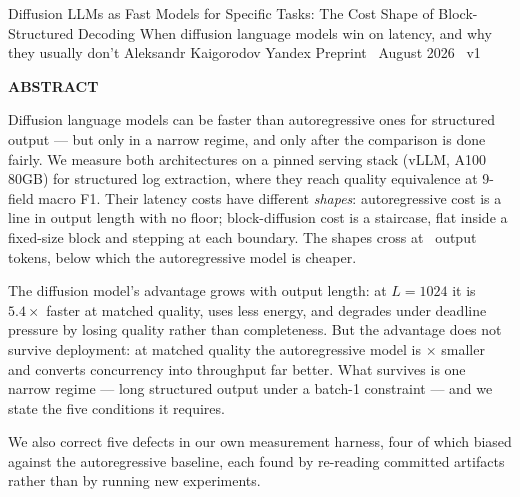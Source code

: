 \documentclass[11pt]{article}
\begin{document}
\papertitle
  {Diffusion LLMs as Fast Models for Specific Tasks: The Cost Shape of Block-Structured Decoding}
  {When diffusion language models win on latency, and why they usually don't}
  {Aleksandr Kaigorodov}
  {Yandex}
  {Preprint \textperiodcentered\ August 2026 \textperiodcentered\ v1}

\begingroup
\small
\noindent
{\sffamily\bfseries\footnotesize\color{deepink}ABSTRACT}\par
\vspace{3pt}
\noindent
Diffusion language models can be faster than autoregressive ones for
structured output --- but only in a narrow regime, and only after the
comparison is done fairly. We measure both architectures on a pinned serving
stack (vLLM, A100 80GB) for structured log extraction, where they reach
quality equivalence at 9-field macro F1. Their latency costs have different
\emph{shapes}: autoregressive cost is a line in output length with no floor;
block-diffusion cost is a staircase, flat inside a fixed-size block and
stepping at each boundary. The shapes cross at \crossoverL\ output tokens,
below which the autoregressive model is cheaper.

The diffusion model's advantage grows with output length: at $L{=}1024$ it is
$5.4\times$ faster at matched quality, uses less energy, and degrades under
deadline pressure by losing quality rather than completeness. But the advantage
does not survive deployment: at matched quality the autoregressive model is
\footprintRatio$\times$ smaller and converts concurrency into throughput far
better. What survives is one narrow regime --- long structured output under a
batch-1 constraint --- and we state the five conditions it requires.

We also correct five defects in our own measurement harness, four of which
biased against the autoregressive baseline, each found by re-reading committed
artifacts rather than by running new experiments.
\endgroup

\vspace{4pt}
\end{document}
